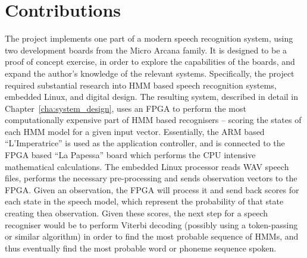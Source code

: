 \section{Contributions} %
\label{sec:contributions}
	The project implements one part of a modern speech recognition system, using two development boards from the Micro Arcana family.  It is designed to be a proof of concept exercise, in order to explore the capabilities of the boards, and expand the author's knowledge of the relevant systems.  Specifically, the project required substantial research into HMM based speech recognition systems, embedded Linux, and digital design.  The resulting system, described in detail in Chapter~\ref{cha:system_design}, uses an FPGA to perform the most computationally expensive part of HMM based recognisers -- scoring the states of each HMM model for a given input vector.  Essentially, the ARM based ``L'Imperatrice'' is used as the application controller, and is connected to the FPGA based ``La Papessa'' board which performs the CPU intensive mathematical calculations.  The embedded Linux processor reads WAV speech files, performs the necessary pre-processing and sends observation vectors to the FPGA.  Given an observation, the FPGA will process it and send back scores for each state in the speech model, which represent the probability of that state creating thea observation.  Given these scores, the next step for a speech recogniser would be to perform Viterbi decoding (possibly using a token-passing or similar algorithm) in order to find the most probable sequence of HMMs, and thus eventually find the most probable word or phoneme sequence spoken.



